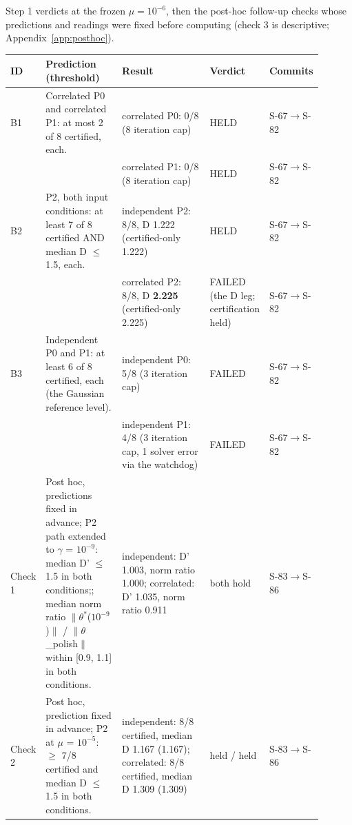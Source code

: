 Step 1 verdicts at the frozen $\mu = 10^{-6}$, then the post-hoc follow-up checks whose predictions and readings were fixed before computing (check 3 is descriptive; Appendix~\ref{app:posthoc}).

{\footnotesize\setlength{\tabcolsep}{3pt}
\begin{longtable}{R{0.07\linewidth} R{0.28\linewidth} R{0.35\linewidth} R{0.09\linewidth} R{0.11\linewidth}}
\toprule
ID & Prediction (threshold) & Result & Verdict & Commits \\
\midrule
\endhead
B1 & Correlated P0 and correlated P1: at most 2 of 8 certified, each. & correlated P0: 0/8 (8 iteration cap) & HELD & S-67$\to$\allowbreak S-82 \\
 &  & correlated P1: 0/8 (8 iteration cap) & HELD & S-67$\to$\allowbreak S-82 \\
B2 & P2, both input conditions: at least 7 of 8 certified AND median D $\leq$ 1.5, each. & independent P2: 8/8, D 1.222 (certified-only 1.222) & HELD & S-67$\to$\allowbreak S-82 \\
 &  & correlated P2: 8/8, D \textbf{2.225} (certified-only 2.225) & FAILED (the D leg; certification held) & S-67$\to$\allowbreak S-82 \\
B3 & Independent P0 and P1: at least 6 of 8 certified, each (the Gaussian reference level). & independent P0: 5/8 (3 iteration cap) & FAILED & S-67$\to$\allowbreak S-82 \\
 &  & independent P1: 4/8 (3 iteration cap, 1 solver error via the watchdog) & FAILED & S-67$\to$\allowbreak S-82 \\
Check 1 & Post hoc, predictions fixed in advance; P2 path extended to $\gamma$ = $10^{-9}$: median D' $\leq$ 1.5 in both conditions;; median norm ratio $\|\theta^{*}$($10^{-9}$)$\|$ / $\|\theta$\_polish$\|$ within [0.9, 1.1] in both conditions. & independent: D' 1.003, norm ratio 1.000; correlated: D' 1.035, norm ratio 0.911 & both hold & S-83$\to$\allowbreak S-86 \\
Check 2 & Post hoc, prediction fixed in advance; P2 at $\mu$ = $10^{-5}$: $\geq$ 7/8 certified and median D $\leq$ 1.5 in both conditions. & independent: 8/8 certified, median D 1.167 (1.167); correlated: 8/8 certified, median D 1.309 (1.309) & held / held & S-83$\to$\allowbreak S-86 \\
\bottomrule
\end{longtable}}